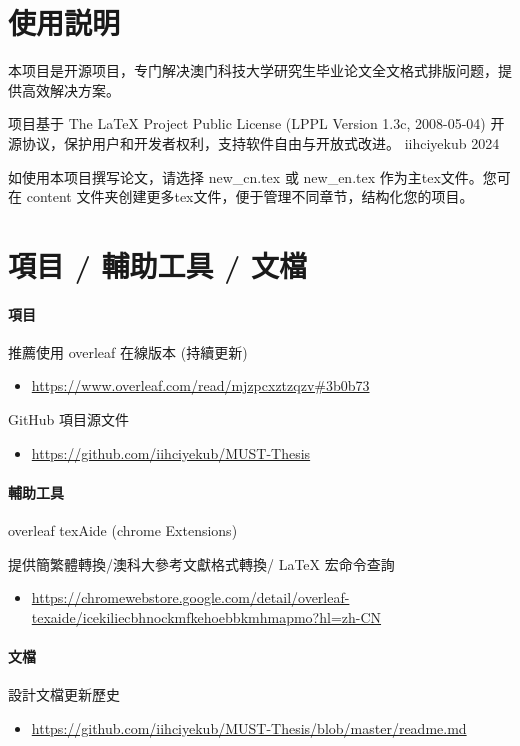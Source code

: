 \documentclass[
    writingLanguage=chinese, %
    addPageTitle=on,  %
    addDeclaration=on, %
    addMUSTlog=off, %
    addFigTOC=on, %
    addTabTOC=on, %
    refIndent=off, %
    printMod=off, %
]{must}
\begin{document}
\addtableofcontents


\chapter{使用説明}
本项目是开源项目，专门解决澳门科技大学研究生毕业论文全文格式排版问题，提供高效解决方案。

项目基于 The LaTeX Project Public License (LPPL Version 1.3c, 2008-05-04) 开源协议，保护用户和开发者权利，支持软件自由与开放式改进。 \faCopyright iihciyekub 2024

如使用本项目撰写论文，请选择 new\_cn.tex 或 new\_en.tex 作为主tex文件。您可在 content 文件夹创建更多tex文件，便于管理不同章节，结构化您的项目。

\chapter{項目 / 輔助工具 / 文檔}
\subsubsection{項目}

\noindent \faLeaf\; 推薦使用 overleaf 在線版本 (持續更新) 
\begin{itemize}
    \item \url{https://www.overleaf.com/read/mjzpcxztzqzv#3b0b73}
\end{itemize}

\noindent \faGithub\;  GitHub 項目源文件 
\begin{itemize}
    \item \url{https://github.com/iihciyekub/MUST-Thesis}
\end{itemize}


\subsubsection{輔助工具}

\noindent \faChrome\; overleaf texAide (chrome Extensions) 

提供簡繁體轉換/澳科大參考文獻格式轉換/ \LaTeX{} 宏命令查詢 
\begin{itemize}
    \item \url{https://chromewebstore.google.com/detail/overleaf-texaide/icekiliecbhnockmfkehoebbkmhmapmo?hl=zh-CN}
\end{itemize}



\subsubsection{文檔}
\noindent \faHistory\; 設計文檔更新歷史 
\begin{itemize}
    \item \url{https://github.com/iihciyekub/MUST-Thesis/blob/master/readme.md}
\end{itemize}
\end{document}

